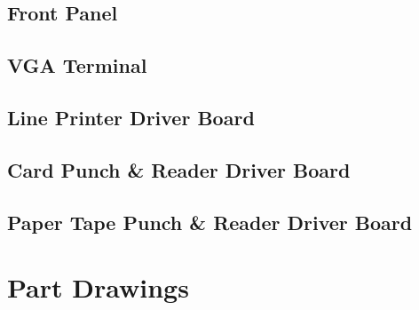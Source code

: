\documentclass{book}
\begin{document}
\section{Front Panel}
\clearpage

\section{VGA Terminal}
\clearpage

\section{Line Printer Driver Board}
\clearpage

\section{Card Punch \& Reader Driver Board}
\clearpage

\section{Paper Tape Punch \& Reader Driver Board}

\chapter{Part Drawings}

\backmatter


\end{document}
